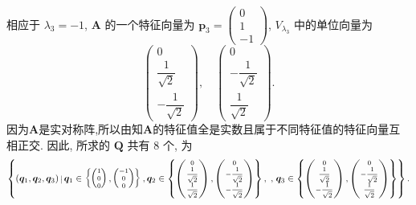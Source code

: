 \documentclass[../../main.tex]{subfiles}%
\begin{document}
\begin{solution}
相应于 \( \lambda_3 = -1 \), \( \boldsymbol{A} \) 的一个特征向量为 \( \boldsymbol{p}_3 = \begin{pmatrix} 0 \\ 1 \\ -1 \end{pmatrix} \), \( V_{\lambda_3} \) 中的单位向量为
\[
\begin{pmatrix} 0 \\ \dfrac{1}{\sqrt{2}} \\ -\dfrac{1}{\sqrt{2}} \end{pmatrix}, \quad \begin{pmatrix} 0 \\ -\dfrac{1}{\sqrt{2}} \\ \dfrac{1}{\sqrt{2}} \end{pmatrix}.
\]
因为$\boldsymbol{A}$是实对称阵,所以由知$\boldsymbol{A}$的特征值全是实数且属于不同特征值的特征向量互相正交.
因此, 所求的 \( \boldsymbol{Q} \) 共有 \( 8 \) 个, 为
$$
\begin{scriptsize}
\left\{ (\boldsymbol{q}_1, \boldsymbol{q}_2, \boldsymbol{q}_3) \,\big|\, \boldsymbol{q}_1 \in \left\{ \begin{pmatrix} 1 \\ 0 \\ 0 \end{pmatrix}, \begin{pmatrix} -1 \\ 0 \\ 0 \end{pmatrix} \right\}, \boldsymbol{q}_2 \in \left\{ \begin{pmatrix} 0 \\ \dfrac{1}{\sqrt{2}} \\ \dfrac{1}{\sqrt{2}} \end{pmatrix}, \begin{pmatrix} 0 \\ -\dfrac{1}{\sqrt{2}} \\ -\dfrac{1}{\sqrt{2}} \end{pmatrix} \right\}, \right.,
\left. \boldsymbol{q}_3 \in \left\{ \begin{pmatrix} 0 \\ \dfrac{1}{\sqrt{2}} \\ -\dfrac{1}{\sqrt{2}} \end{pmatrix}, \begin{pmatrix} 0 \\ -\dfrac{1}{\sqrt{2}} \\ \dfrac{1}{\sqrt{2}} \end{pmatrix} \right\} \right\}.
\end{scriptsize}
$$

\end{solution}
\end{document}
